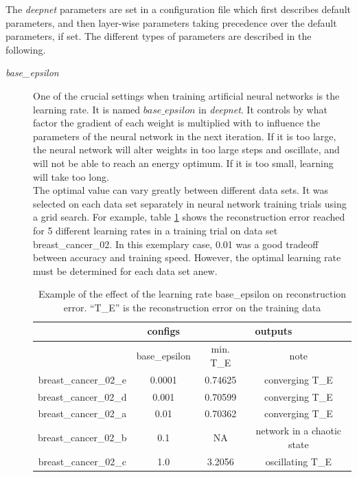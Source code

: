 The \emph{deepnet }parameters are set in a configuration file which
first describes default parameters, and then layer-wise parameters
taking precedence over the default parameters, if set. The different
types of parameters are described in the following.
\begin{description}
\item [{\emph{base\_epsilon}}] One of the crucial settings when training
artificial neural networks is the learning rate.
It is named \emph{$base\textrm{\_}epsilon$} in \emph{deepnet}. It
controls by what factor the gradient of each weight is multiplied
with to influence the parameters of the neural network in the next
iteration. If it is too large, the neural network will alter weights
in too large steps and oscillate, and will not be able to reach an
energy optimum. If it is too small, learning will take too long.\\
The optimal value can vary greatly between different data sets. It
was selected on each data set separately in neural network training
trials using a grid search. For example, table \ref{tab:Effect-of-learning-rate-on-reconstruction-error}
shows the reconstruction error reached for 5 different learning rates
in a training trial on data set breast\_cancer\_02. In this exemplary
case, 0.01 was a good tradeoff between accuracy and training speed.
However, the optimal learning rate must be determined for each data
set anew. 
\begin{table}
\begin{centering}
\begin{tabular}{|c|c|c|c|}
\hline 
 & \multicolumn{1}{c|}{configs} & \multicolumn{2}{c|}{outputs}\tabularnewline
\hline 
 & base\_epsilon & min. T\_E & note\tabularnewline
\hline 
\hline 
breast\_cancer\_02\_e & 0.0001 & 0.74625 & converging T\_E\tabularnewline
\hline 
breast\_cancer\_02\_d & 0.001 & 0.70599 & converging T\_E\tabularnewline
\hline 
breast\_cancer\_02\_a & 0.01 & 0.70362 & converging T\_E\tabularnewline
\hline 
breast\_cancer\_02\_b & 0.1 & NA & network in a chaotic state\tabularnewline
\hline 
breast\_cancer\_02\_c & 1.0 & 3.2056 & oscillating T\_E\tabularnewline
\hline 
\end{tabular}
\par\end{centering}
\caption[Example of the effect of the learning rate base\_epsilon on reconstruction
error.]{\label{tab:Effect-of-learning-rate-on-reconstruction-error}Example
of the effect of the learning rate base\_epsilon on reconstruction
error. ``T\_E'' is the reconstruction error on the training data
}
\end{table}
\end{description}

